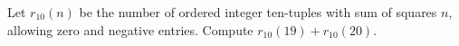 Let $r_{10}(n)$ be the number of ordered integer ten-tuples with sum of squares $n$, allowing zero and negative entries. Compute $r_{10}(19)+r_{10}(20)$.
